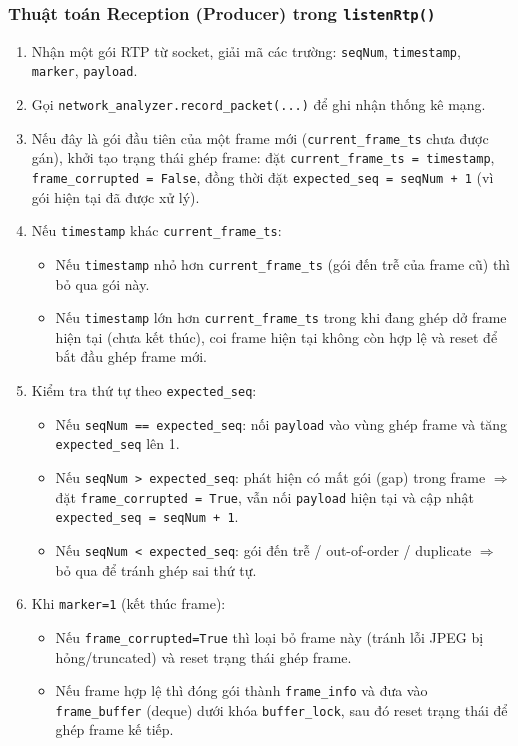 \subsubsection{Thuật toán Reception (Producer) trong \texttt{listenRtp()}}
\begin{enumerate}
    \item Nhận một gói RTP từ socket, giải mã các trường: \texttt{seqNum}, \texttt{timestamp}, \texttt{marker}, \texttt{payload}.
    \item Gọi \texttt{network\_analyzer.record\_packet(...)} để ghi nhận thống kê mạng.
    \item Nếu đây là gói đầu tiên của một frame mới (\texttt{current\_frame\_ts} chưa được gán), khởi tạo trạng thái ghép frame:
    đặt \texttt{current\_frame\_ts = timestamp}, \texttt{frame\_corrupted = False}, đồng thời đặt
    \texttt{expected\_seq = seqNum + 1} (vì gói hiện tại đã được xử lý).
    \item Nếu \texttt{timestamp} khác \texttt{current\_frame\_ts}:
    \begin{itemize}
        \item Nếu \texttt{timestamp} nhỏ hơn \texttt{current\_frame\_ts} (gói đến trễ của frame cũ) thì bỏ qua gói này.
        \item Nếu \texttt{timestamp} lớn hơn \texttt{current\_frame\_ts} trong khi đang ghép dở frame hiện tại (chưa kết thúc), coi frame hiện tại không còn hợp lệ và reset để bắt đầu ghép frame mới.
    \end{itemize}
    \item Kiểm tra thứ tự theo \texttt{expected\_seq}:
    \begin{itemize}
        \item Nếu \texttt{seqNum == expected\_seq}: nối \texttt{payload} vào vùng ghép frame và tăng \texttt{expected\_seq} lên 1.
        \item Nếu \texttt{seqNum > expected\_seq}: phát hiện có mất gói (gap) trong frame $\Rightarrow$
        đặt \texttt{frame\_corrupted = True}, vẫn nối \texttt{payload} hiện tại và cập nhật \texttt{expected\_seq = seqNum + 1}.
        \item Nếu \texttt{seqNum < expected\_seq}: gói đến trễ / out-of-order / duplicate $\Rightarrow$ bỏ qua để tránh ghép sai thứ tự.
    \end{itemize}
    \item Khi \texttt{marker=1} (kết thúc frame):
    \begin{itemize}
        \item Nếu \texttt{frame\_corrupted=True} thì loại bỏ frame này (tránh lỗi JPEG bị hỏng/truncated) và reset trạng thái ghép frame.
        \item Nếu frame hợp lệ thì đóng gói thành \texttt{frame\_info} và đưa vào \texttt{frame\_buffer} (deque) dưới khóa \texttt{buffer\_lock}, sau đó reset trạng thái để ghép frame kế tiếp.
    \end{itemize}
\end{enumerate}



